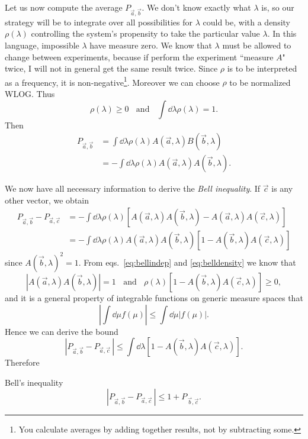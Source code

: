 Let us now compute the average $P_{\vec{a},\vec{b}}$. We don't know 
exactly what $\lambda$ is, so our strategy will be to integrate over all 
possibilities for $\lambda$
could be, with a density $\rho(\lambda)$ controlling the system's propensity
to take the particular value $\lambda$. In this language, impossible
$\lambda$ have measure zero. We know that $\lambda$ must be allowed to
change between experiments, because if perform the experiment ``measure $A$"
twice, I will not in general get the same result twice. Since $\rho$ is to
be interpreted as a frequency, it is non-negative\footnote{You calculate
averages by adding together results, not by subtracting some.}.
Moreover we can choose $\rho$ to be normalized WLOG. Thus
\begin{equation}\label{eq:belldensity}
  \rho(\lambda)\geq 0~~~~\text{and}~~~~\int\dd{\lambda}\rho(\lambda)=1.
\end{equation}
Then
\begin{equation}\begin{aligned}
  P_{\vec{a},\vec{b}}
         &=\int\dd{\lambda}\rho(\lambda)A(\vec{a},\lambda)B(\vec{b},\lambda)\\
         &=-\int\dd{\lambda}\rho(\lambda)A(\vec{a},\lambda)A(\vec{b},\lambda).
\end{aligned}\end{equation}

We now have all necessary information to derive the {\it Bell inequality}. 
If $\vec{c}$ is any other vector, we obtain
\begin{equation}\begin{aligned}
  P_{\vec{a},\vec{b}}-P_{\vec{a},\vec{c}}
   &=-\int\dd{\lambda}\rho(\lambda)
      \left[A(\vec{a},\lambda)A(\vec{b},\lambda)-
            A(\vec{a},\lambda)A(\vec{c},\lambda)\right]\\
   &=-\int\dd{\lambda}\rho(\lambda)
      A(\vec{a},\lambda)A(\vec{b},\lambda)
      \left[1-A(\vec{b},\lambda)A(\vec{c},\lambda)\right]
\end{aligned}\end{equation}
since $A(\vec{b},\lambda)^2=1$. From eqs.~\eqref{eq:bellindep} and
\eqref{eq:belldensity} we know that
\begin{equation}
  |A(\vec{a},\lambda)A(\vec{b},\lambda)|=1~~~~\text{and}~~~~
  \rho(\lambda)\left[1-A(\vec{b},\lambda)A(\vec{c},\lambda)\right]\geq0,
\end{equation}
and it is a general property of integrable functions on generic
measure spaces that
\begin{equation}
  \left|\int\dd{\mu}f(\mu)\right|\leq\int\dd{\mu}|f(\mu)|.
\end{equation}
Hence we can derive the bound
\begin{equation}
  |P_{\vec{a},\vec{b}}-P_{\vec{a},\vec{c}}\,|
  \leq\int\dd{\lambda}\left[1-A(\vec{b},\lambda)A(\vec{c},\lambda)\right].
\end{equation}
Therefore
\begin{theorem}{Bell's inequality}{}
  $$
  |P_{\vec{a},\vec{b}}-P_{\vec{a},\vec{c}}\,|
  \leq1+P_{\,\vec{b},\vec{c}}.
  $$
\end{theorem}

